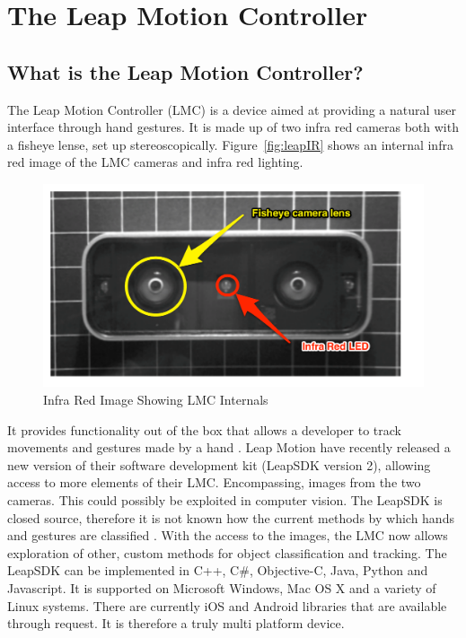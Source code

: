 \documentclass[11pt,oneside]{report}
\begin{document}
		\section{The Leap Motion Controller}
			\subsection{What is the Leap Motion Controller?}
				The Leap Motion Controller (LMC) is a device aimed at providing a natural user interface through hand gestures.
				It is made up of two infra red cameras both with a fisheye lense, set up stereoscopically.
				Figure~\ref{fig:leapIR} shows an internal infra red image of the LMC cameras and infra red lighting.
				\begin{figure}[!ht]
				\centering
					\includegraphics[width=\textwidth]{leap_ir.pdf}
					\caption{Infra Red Image Showing LMC Internals\protect {\label{fig:leapIR}}}
				\end{figure}
				It provides functionality out of the box that allows a developer to track movements and gestures made by a hand \cite{web:leapGestures}.
				Leap Motion have recently released a new version of their software development kit (LeapSDK version 2), allowing access to more elements of their LMC. 
				Encompassing, images from the two cameras. 
				This could possibly be exploited in computer vision. %
				The LeapSDK is closed source, therefore it is not known how the current methods by which hands and gestures are classified \cite[p. 217]{journal:leapEvaluation}.
				With the access to the images, the LMC now allows exploration of other, custom methods for object classification and tracking.
				The LeapSDK can be implemented in C++, C\#, Objective-C, Java, Python and Javascript.
				It is supported on Microsoft Windows, Mac OS X and a variety of Linux systems.
				There are currently iOS and Android libraries that are available through request.
				It is therefore a truly multi platform device.
				
\end{document}
